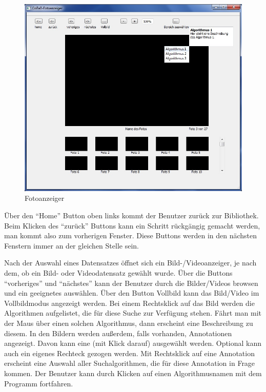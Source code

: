 \begin{figure}[H]
\includegraphics[width=1\linewidth]{img/Fotoanzeiger}
\caption{Fotoanzeiger}
\label{fig:fotoanzeiger}
\end{figure}
Über den \enquote{Home} Button oben links kommt der Benutzer zurück zur Bibliothek. Beim Klicken des \enquote{zurück} Buttons kann ein Schritt rückgängig gemacht werden, man kommt also zum vorherigen Fenster. Diese Buttons werden in den nächsten Fenstern immer an der gleichen Stelle sein.

Nach der Auswahl eines Datensatzes öffnet sich ein Bild-/Videoanzeiger, je nach dem, ob ein Bild- oder Videodatensatz gewählt wurde. Über die Buttons \enquote{vorheriges} und \enquote{nächstes} kann der Benutzer durch die Bilder/Videos browsen und ein geeignetes auswählen. Über den Button Vollbild kann das Bild/Video im Vollbildmodus angezeigt werden.
Bei einem Rechtsklick auf das Bild werden die Algorithmen aufgelistet, die für diese Suche zur Verfügung stehen. Fährt man mit der Maus über einen solchen Algorithmus, dann erscheint eine Beschreibung zu diesem.
In den Bildern werden außerdem, falls vorhanden, Annotationen angezeigt. Davon kann eine (mit Klick darauf) ausgewählt werden. Optional kann auch ein eigenes Rechteck gezogen werden. Mit Rechtsklick auf eine Annotation erscheint eine Auswahl aller Suchalgorithmen, die für diese Annotation in Frage kommen. Der Benutzer kann durch Klicken auf einen Algorithmusnamen mit dem Programm fortfahren.

